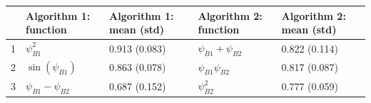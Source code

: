 \begin{tabular}{lllll}
\toprule
 & Algorithm 1: function & Algorithm 1: mean (std) & Algorithm 2: function & Algorithm 2: mean (std) \\
\midrule
1 & $\psi_{B1}^2$ & 0.913 (0.083) & $\psi_{B1}+\psi_{B2}$ & 0.822 (0.114) \\
2 & $\sin(\psi_{B1})$ & 0.863 (0.078) & $\psi_{B1}\psi_{B2}$ & 0.817 (0.087) \\
3 & $\psi_{B1}-\psi_{B2}$ & 0.687 (0.152) & $\psi_{B2}^2$ & 0.777 (0.059) \\
\bottomrule
\end{tabular}
